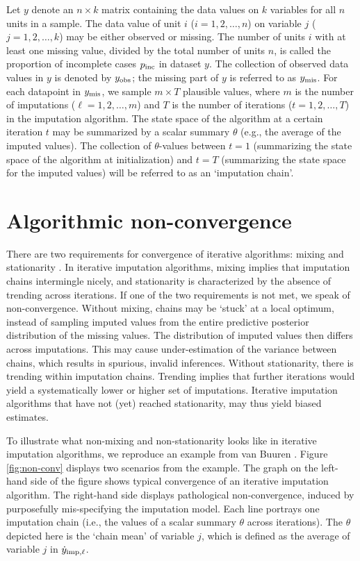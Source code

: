 \documentclass[Royal,times,sageh]{sagej}
\begin{document}
Let \(y\) denote an \(n \times k\) matrix containing the data values on \(k\) variables for all \(n\) units in a sample. The data value of unit \(i\) (\(i = 1, 2, \dots, n\)) on variable \(j\) (\(j = 1, 2, \dots, k\)) may be either observed or missing. The number of units \(i\) with at least one missing value, divided by the total number of units \(n\), is called the proportion of incomplete cases \(p_{\rm inc}\) in dataset \(y\). The collection of observed data values in \(y\) is denoted by \(y_{\rm obs}\); the missing part of \(y\) is referred to as \(y_{\rm mis}\). For each datapoint in \(y_{\rm mis}\), we sample \(m \times T\) plausible values, where \(m\) is the number of imputations (\(\ell = 1, 2, \dots, m\)) and \(T\) is the number of iterations (\(t = 1, 2, \dots, T\)) in the imputation algorithm. The state space of the algorithm at a certain iteration \(t\) may be summarized by a scalar summary \(\theta\) (e.g., the average of the imputed values). The collection of \(\theta\)-values between \(t=1\) (summarizing the state space of the algorithm at initialization) and \(t=T\) (summarizing the state space for the imputed values) will be referred to as an `imputation chain'.

\hypertarget{algorithmic-non-convergence}{%
\section{Algorithmic non-convergence}\label{algorithmic-non-convergence}}

There are two requirements for convergence of iterative algorithms: mixing and stationarity \citep{gelm13}. In iterative imputation algorithms, mixing implies that imputation chains intermingle nicely, and stationarity is characterized by the absence of trending across iterations. If one of the two requirements is not met, we speak of non-convergence. Without mixing, chains may be `stuck' at a local optimum, instead of sampling imputed values from the entire predictive posterior distribution of the missing values. The distribution of imputed values then differs across imputations. This may cause under-estimation of the variance between chains, which results in spurious, invalid inferences. Without stationarity, there is trending within imputation chains. Trending implies that further iterations would yield a systematically lower or higher set of imputations. Iterative imputation algorithms that have not (yet) reached stationarity, may thus yield biased estimates.

To illustrate what non-mixing and non-stationarity looks like in iterative imputation algorithms, we reproduce an example from van Buuren \citeyearpar[\(\S\) 6.5.2]{buur18}. Figure \ref{fig:non-conv} displays two scenarios from the example. The graph on the left-hand side of the figure shows typical convergence of an iterative imputation algorithm. The right-hand side displays pathological non-convergence, induced by purposefully mis-specifying the imputation model. Each line portrays one imputation chain (i.e., the values of a scalar summary \(\theta\) across iterations). The \(\theta\) depicted here is the `chain mean' of variable \(j\), which is defined as the average of variable \(j\) in \(\dot y_{\rm imp, \ell}\).
\end{document}
